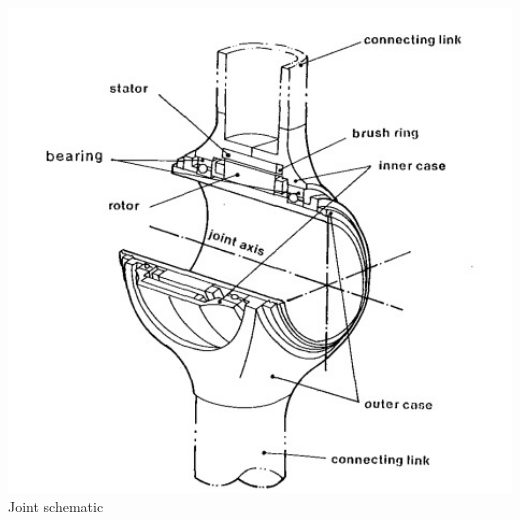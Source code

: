 \begin{frame}
\begin{columns}[t]
\begin{column}{.45\columnwidth}
\begin{minipage}[b]{\textwidth}
			\includegraphics[width=1.2\textwidth, height=1.5\textwidth]{figures/dd_joints.jpg} \\
			\footnotesize{Joint schematic} %
	\end{minipage}
	\end{column}
\end{columns}
\end{frame}

